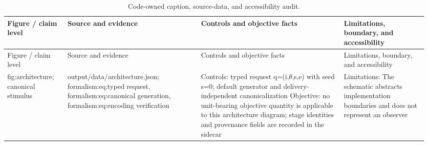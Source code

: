 \documentclass[
  english,
]{article}
\begin{document}
\begin{longtable}[]{@{}
  >{\raggedright\arraybackslash}p{}
  >{\raggedright\arraybackslash}p{}
  >{\raggedright\arraybackslash}p{}
  >{\raggedright\arraybackslash}p{}@{}}
\caption{Code-owned caption, source-data, and accessibility
audit.}\label{tbl:caption_audit}\tabularnewline
\toprule\noalign{}
\begin{minipage}[b]{\linewidth}\raggedright
Figure / claim level
\end{minipage} & \begin{minipage}[b]{\linewidth}\raggedright
Source and evidence
\end{minipage} & \begin{minipage}[b]{\linewidth}\raggedright
Controls and objective facts
\end{minipage} & \begin{minipage}[b]{\linewidth}\raggedright
Limitations, boundary, and accessibility
\end{minipage} \\
\midrule\noalign{}
\endfirsthead
\toprule\noalign{}
\begin{minipage}[b]{\linewidth}\raggedright
Figure / claim level
\end{minipage} & \begin{minipage}[b]{\linewidth}\raggedright
Source and evidence
\end{minipage} & \begin{minipage}[b]{\linewidth}\raggedright
Controls and objective facts
\end{minipage} & \begin{minipage}[b]{\linewidth}\raggedright
Limitations, boundary, and accessibility
\end{minipage} \\
\midrule\noalign{}
\endhead
\bottomrule\noalign{}
\endlastfoot
fig:architecture; canonical stimulus & output/data/architecture.json;
formalism:eq:typed request, formalism:eq:canonical generation,
formalism:eq:encoding verification & Controls: typed request q=(i,\texorpdfstring{\ensuremath{\theta}}{theta},s,e)
with seed s=0; default generator and delivery-independent
canonicalization Objective: no unit-bearing objective quantity is
applicable to this architecture diagram; stage identities and provenance
fields are recorded in the sidecar & Limitations: The schematic
abstracts implementation boundaries and does not represent an observer

\end{longtable}
\end{document}
